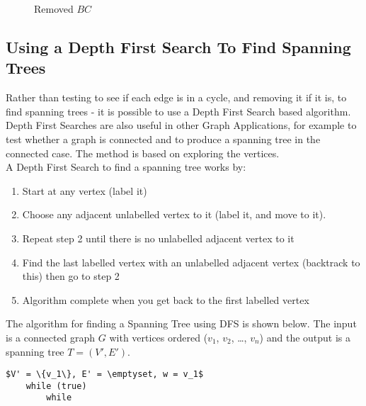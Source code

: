 \begin{minipage}[b][][b]{0.3\textwidth}
    \begin{figure}[H]
        \centering
        \caption{Removed $BC$}
    \end{figure}
\end{minipage} \vspace{0.5em}

\subsection{Using a Depth First Search To Find Spanning Trees}
Rather than testing to see if each edge is in a cycle, and removing it if it is, to find spanning trees - it is possible to use a Depth First Search based algorithm. Depth First Searches are also useful in other Graph Applications, for example to test whether a graph is connected and to produce a spanning tree in the connected case. The method is based on exploring the vertices.\\

A Depth First Search to find a spanning tree works by:
\begin{enumerate}
    \item Start at any vertex (label it)
    \item Choose any adjacent unlabelled vertex to it (label it, and move to it).
    \item Repeat step 2 until there is no unlabelled adjacent vertex to it
    \item Find the last labelled vertex with an unlabelled adjacent vertex (backtrack to this) then go to step 2
    \item Algorithm complete when you get back to the first labelled vertex
\end{enumerate}

The algorithm for finding a Spanning Tree using DFS is shown below. The input is a connected graph $G$ with vertices ordered ($v_1$, $v_2$, \ldots, $v_n$) and the output is a spanning tree $T = (V', E')$.

\begin{lstlisting}[style=haskellTrace]
    $V' = \{v_1\}, E' = \emptyset, w = v_1$
    while (true)
        while
\end{lstlisting}